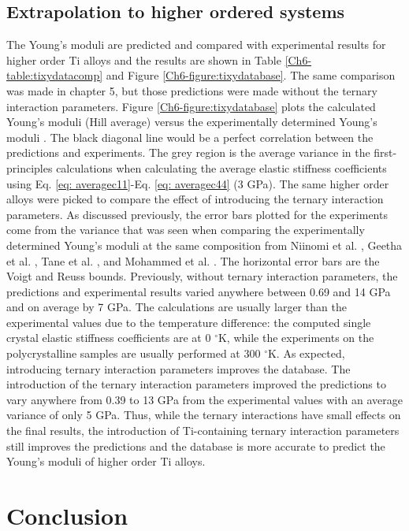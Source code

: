 \subsection{Extrapolation to higher ordered systems}

The Young's moduli are predicted and compared with experimental results for higher order Ti alloys and the results are shown in Table \ref{Ch6-table:tixydatacomp} and Figure \ref{Ch6-figure:tixydatabase}. The same comparison was made in chapter 5, but those predictions were made without the ternary interaction parameters. Figure \ref{Ch6-figure:tixydatabase} plots the calculated Young's moduli (Hill average) versus the experimentally determined Young's moduli \cite{Tane2010a,Mohammed2014,Geetha2009}. The black diagonal line would be a perfect correlation between the predictions and experiments. The grey region is the average variance in the first-principles calculations when calculating the average elastic stiffness coefficients using Eq. \ref{eq: averagec11}-Eq. \ref{eq: averagec44} (3 GPa). The same higher order alloys were picked to compare the effect of introducing the ternary interaction parameters. As discussed previously, the error bars plotted for the experiments come from the variance that was seen when comparing the experimentally determined Young's moduli at the same composition from Niinomi et al. \cite{Niinomi2012}, Geetha et al. \cite{Geetha2009}, Tane et al. \cite{Tane2010a}, and Mohammed et al. \cite{Mohammed2014}. The horizontal error bars are the Voigt and Reuss bounds. Previously, without ternary interaction parameters, the predictions and experimental results varied anywhere between 0.69 and 14 GPa and on average by 7 GPa. The calculations are usually larger than the experimental values due to the temperature difference: the computed single crystal elastic stiffness coefficients are at 0 $^\circ$K, while the experiments on the polycrystalline samples are usually performed at 300 $^\circ$K. As expected, introducing ternary interaction parameters improves the database. The introduction of the ternary interaction parameters improved the predictions to vary anywhere from 0.39 to 13 GPa from the experimental values with an average variance of only 5 GPa. Thus, while the ternary interactions have small effects on the final results, the introduction of Ti-containing ternary interaction parameters still improves the predictions and the database is more accurate to predict the Young's moduli of higher order Ti alloys. 

\section{Conclusion}

